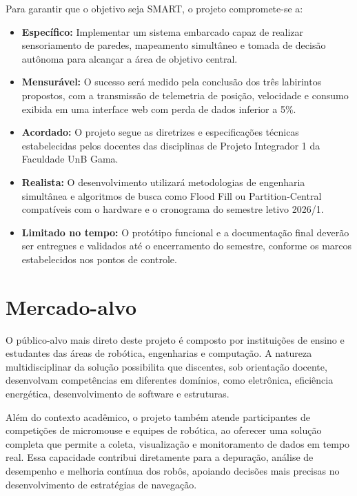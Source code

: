 Para garantir que o objetivo seja SMART, o projeto compromete-se a:
\begin{itemize}
    \item \textbf{Específico:} Implementar um sistema embarcado capaz de realizar sensoriamento de paredes, mapeamento simultâneo e tomada de decisão autônoma para alcançar a área de objetivo central.
    \item \textbf{Mensurável:} O sucesso será medido pela conclusão dos três labirintos propostos, com a transmissão de telemetria de posição, velocidade e consumo exibida em uma interface web com perda de dados inferior a 5\%.
    \item \textbf{Acordado:} O projeto segue as diretrizes e especificações técnicas estabelecidas pelos docentes das disciplinas de Projeto Integrador 1 da Faculdade UnB Gama.
    \item \textbf{Realista:} O desenvolvimento utilizará metodologias de engenharia simultânea e algoritmos de busca como Flood Fill ou Partition-Central compatíveis com o hardware e o cronograma do semestre letivo 2026/1.
    \item \textbf{Limitado no tempo:} O protótipo funcional e a documentação final deverão ser entregues e validados até o encerramento do semestre, conforme os marcos estabelecidos nos pontos de controle.
\end{itemize}

\section{Mercado-alvo}


O público-alvo mais direto deste projeto é composto por instituições de ensino e estudantes das áreas de robótica, engenharias e computação. A natureza multidisciplinar da solução \cite{jabuti2022} possibilita que discentes, sob orientação docente, desenvolvam competências em diferentes domínios, como eletrônica, eficiência energética, desenvolvimento de software e estruturas.

Além do contexto acadêmico, o projeto também atende participantes de competições de micromouse e equipes de robótica, ao oferecer uma solução completa que permite a coleta, visualização e monitoramento de dados em tempo real. Essa capacidade contribui diretamente para a depuração, análise de desempenho e melhoria contínua dos robôs, apoiando decisões mais precisas no desenvolvimento de estratégias de navegação.

